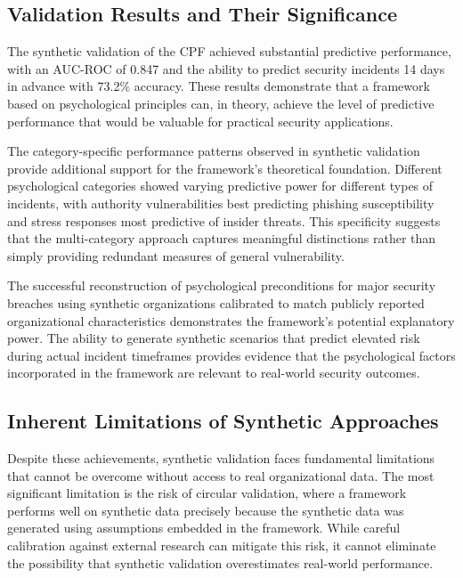 \documentclass[10pt,twocolumn]{IEEEtran}
\begin{document}
\subsection{Validation Results and Their Significance}

The synthetic validation of the CPF achieved substantial predictive performance, with an AUC-ROC of 0.847 and the ability to predict security incidents 14 days in advance with 73.2\% accuracy. These results demonstrate that a framework based on psychological principles can, in theory, achieve the level of predictive performance that would be valuable for practical security applications.

The category-specific performance patterns observed in synthetic validation provide additional support for the framework's theoretical foundation. Different psychological categories showed varying predictive power for different types of incidents, with authority vulnerabilities best predicting phishing susceptibility and stress responses most predictive of insider threats. This specificity suggests that the multi-category approach captures meaningful distinctions rather than simply providing redundant measures of general vulnerability.

The successful reconstruction of psychological preconditions for major security breaches using synthetic organizations calibrated to match publicly reported organizational characteristics demonstrates the framework's potential explanatory power. The ability to generate synthetic scenarios that predict elevated risk during actual incident timeframes provides evidence that the psychological factors incorporated in the framework are relevant to real-world security outcomes.

\subsection{Inherent Limitations of Synthetic Approaches}

Despite these achievements, synthetic validation faces fundamental limitations that cannot be overcome without access to real organizational data. The most significant limitation is the risk of circular validation, where a framework performs well on synthetic data precisely because the synthetic data was generated using assumptions embedded in the framework. While careful calibration against external research can mitigate this risk, it cannot eliminate the possibility that synthetic validation overestimates real-world performance.
\end{document}
